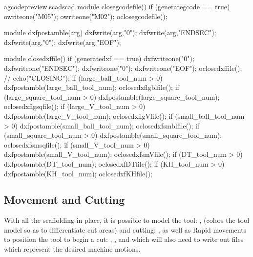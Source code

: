 \documentclass{ltxdoc}
\begin{document}
\lstset{firstnumber=\thegcpscad}
\begin{writecode}{a}{gcodepreview.scad}{scad}
module closegcodefile() {
  if (generategcode == true) {
    owriteone("M05");
    owriteone("M02");
    oclosegcodefile();
  }
}

module dxfpostamble(arg) {
    dxfwrite(arg,"0");
    dxfwrite(arg,"ENDSEC");
    dxfwrite(arg,"0");
    dxfwrite(arg,"EOF");
}

module closedxffile() {
  if (generatedxf == true) {
    dxfwriteone("0");
    dxfwriteone("ENDSEC");
    dxfwriteone("0");
    dxfwriteone("EOF");
    oclosedxffile();
//    echo("CLOSING");
    if (large_ball_tool_num >  0) {    dxfpostamble(large_ball_tool_num);
      oclosedxflgblfile();
    } 
    if (large_square_tool_num >  0) {    dxfpostamble(large_square_tool_num);
      oclosedxflgsqfile();
    } 
    if (large_V_tool_num >  0) {    dxfpostamble(large_V_tool_num);
      oclosedxflgVfile();
    } 
    if (small_ball_tool_num >  0) {    dxfpostamble(small_ball_tool_num);
      oclosedxfsmblfile();
    } 
    if (small_square_tool_num >  0) {    dxfpostamble(small_square_tool_num);
      oclosedxfsmsqfile();
    } 
    if (small_V_tool_num >  0) {    dxfpostamble(small_V_tool_num);
      oclosedxfsmVfile();
    } 
    if (DT_tool_num >  0) {    dxfpostamble(DT_tool_num);
      oclosedxfDTfile();
    } 
    if (KH_tool_num >  0) {    dxfpostamble(KH_tool_num);
      oclosedxfKHfile();
    } 
  }
}

\end{writecode}
\addtocounter{gcpscad}{50}

%
 
\subsection{Movement and Cutting}

With all the scaffolding in place, it is possible to model the tool: , (colors the tool model so as to differentiate cut areas) and cutting: , as well as Rapid movements to position the tool to begin a cut: , , and  which will also need to write out files which represent the desired machine motions.
\end{document}
